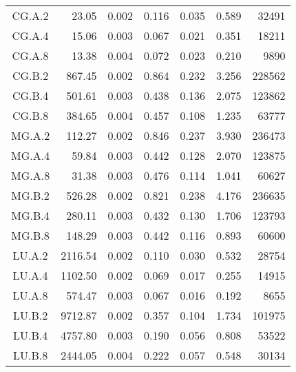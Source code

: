 \begin{longtable}[c]{c*{6}{r}}
  \endfoot%
  \endlastfoot%
  CG.A.2   & 23.05                        & 0.002                        & 0.116 & 0.035 & 0.589 & 32491  \\
  CG.A.4   & 15.06                        & 0.003                        & 0.067 & 0.021 & 0.351 & 18211  \\
  CG.A.8   & 13.38                        & 0.004                        & 0.072 & 0.023 & 0.210 & 9890   \\
  CG.B.2   & 867.45                       & 0.002                        & 0.864 & 0.232 & 3.256 & 228562 \\
  CG.B.4   & 501.61                       & 0.003                        & 0.438 & 0.136 & 2.075 & 123862 \\
  CG.B.8   & 384.65                       & 0.004                        & 0.457 & 0.108 & 1.235 & 63777  \\
  MG.A.2   & 112.27                       & 0.002                        & 0.846 & 0.237 & 3.930 & 236473 \\
  MG.A.4   & 59.84                        & 0.003                        & 0.442 & 0.128 & 2.070 & 123875 \\
  MG.A.8   & 31.38                        & 0.003                        & 0.476 & 0.114 & 1.041 & 60627  \\
  MG.B.2   & 526.28                       & 0.002                        & 0.821 & 0.238 & 4.176 & 236635 \\
  MG.B.4   & 280.11                       & 0.003                        & 0.432 & 0.130 & 1.706 & 123793 \\
  MG.B.8   & 148.29                       & 0.003                        & 0.442 & 0.116 & 0.893 & 60600  \\
  LU.A.2   & 2116.54                      & 0.002                        & 0.110 & 0.030 & 0.532 & 28754  \\
  LU.A.4   & 1102.50                      & 0.002                        & 0.069 & 0.017 & 0.255 & 14915  \\
  LU.A.8   & 574.47                       & 0.003                        & 0.067 & 0.016 & 0.192 & 8655   \\
  LU.B.2   & 9712.87                      & 0.002                        & 0.357 & 0.104 & 1.734 & 101975 \\
  LU.B.4   & 4757.80                      & 0.003                        & 0.190 & 0.056 & 0.808 & 53522  \\
  LU.B.8   & 2444.05                      & 0.004                        & 0.222 & 0.057 & 0.548 & 30134  \\

\end{longtable}

